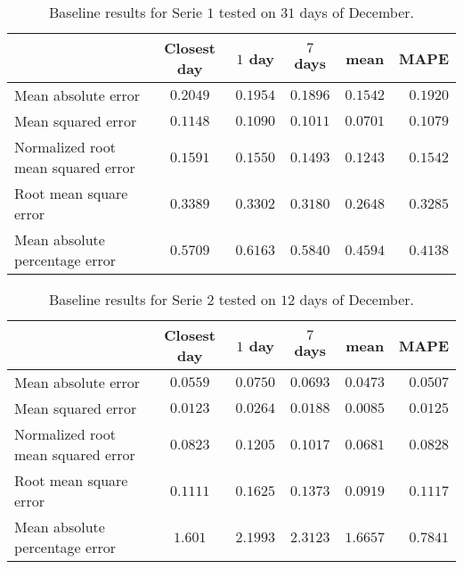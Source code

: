\begin{table}[ht]
	\centering
	\begin{tabular}{@{}l|ccccr@{}} \toprule
			& \textbf{Closest day} & \textbf{$ 1 $ day} & \textbf{$ 7 $ days} & \textbf{mean} & \textbf{MAPE}\\\midrule
		Mean absolute error& \cellcolor{red!25}$0.2049 $&$ 0.1954 $  & $0.1896 $ & \cellcolor{green!25}$ 0.1542 $ & $ 0.1920 $\\
		Mean squared error& \cellcolor{red!25}$0.1148 $&$ 0.1090 $  & $0.1011 $ & \cellcolor{green!25}$ 0.0701 $ & $ 0.1079 $\\
		Normalized root mean squared error& \cellcolor{red!25}$0.1591 $&$ 0.1550$  & $0.1493$ & \cellcolor{green!25}$ 0.1243$ & $ 0.1542$\\
		Root mean square error&\cellcolor{red!25} $0.3389 $&$ 0.3302$  & $0.3180$ & \cellcolor{green!25}$ 0.2648$ & $ 0.3285$\\
		Mean absolute percentage error & $ 0.5709 $&\cellcolor{red!25}$ 0.6163 $  & $ 0.5840 $ & $ 0.4594 $ & \cellcolor{green!25}$ 0.4138 $\\\bottomrule
	\end{tabular}
	\caption{Baseline results for Serie $ 1 $ tested on $ 31 $ days of December.}
	\label{tab:summ_data_serie1}
\end{table}


\begin{table}[ht]
	\centering
	\begin{tabular}{@{}l|ccccr@{}} \toprule
			& \textbf{Closest day} & \textbf{$ 1 $ day} & \textbf{$ 7 $ days} & \textbf{mean} & \textbf{MAPE}\\\midrule
		Mean absolute error& $0.0559 $&\cellcolor{red!25}$ 0.0750 $  & $0.0693 $ & \cellcolor{green!25}$ 0.0473 $ & $ 0.0507 $\\
		Mean squared error& $0.0123 $&\cellcolor{red!25}$ 0.0264 $  & $0.0188 $ & \cellcolor{green!25}$ 0.0085 $ & $ 0.0125 $\\
		Normalized root mean squared error& $0.0823 $&\cellcolor{red!25}$ 0.1205$  & $0.1017$ & \cellcolor{green!25}$ 0.0681$ & $ 0.0828$\\
		Root mean square error& $0.1111 $&$ 0.1625$  &\cellcolor{red!25} $0.1373$ & \cellcolor{green!25}$ 0.0919$ & $ 0.1117$\\
		Mean absolute percentage error & $ 1.601 $&$ 2.1993 $  &\cellcolor{red!25} $ 2.3123 $ & $ 1.6657 $ & \cellcolor{green!25}$ 0.7841 $\\\bottomrule
	\end{tabular}
	\caption{Baseline results for Serie $ 2 $ tested on $ 12 $ days of December.}
	\label{tab:summ_data_serie2}
\end{table}

